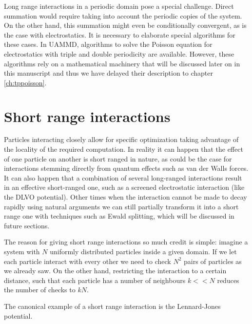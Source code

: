 \documentclass[twoside,openright,titlepage,numbers=noenddot,%
headinclude,footinclude,cleardoublepage=empty,abstract=on,
BCOR=5mm,fontsize=11pt, dvipsnames, paper=b5
]{scrreprt}
\newcommand{\uammd}{\gls{UAMMD}\xspace}
\begin{document}
Long range interactions in a periodic domain pose a special challenge. Direct summation would require taking into account the periodic copies of the system. On the other hand, this summation might even be conditionally convergent, as is the case with electrostatics. It is necessary to elaborate special algorithms for these cases. In \uammd, algorithms to solve the Poisson equation for electrostatics with triple and double periodicity are available. However, these algorithms rely on a mathematical machinery that will be discussed later on in this manuscript and thus we have delayed their description to chapter \ref{ch:tppoisson}.



\chapter{Short range interactions}\label{sec:shortrange}
Particles interacting closely allow for specific optimization taking advantage of the locality of the required computation.
In reality it can happen that the effect of one particle on another is short ranged in nature, as could be the case for interactions stemming directly from quantum effects such as van der Walls forces. It can also happen that a combination of several long-ranged interactions result in an effective short-ranged one, such as a screened electrostatic interaction (like the DLVO potential). Other times when the interaction cannot be made to decay rapidly using natural arguments we can still partially transform it into a short range one with techniques such as Ewald splitting, which will be discussed in future sections.

The reason for giving short range interactions so much credit is simple: imagine a system with $N$ uniformly distributed particles inside a given domain. If we let each particle interact with every other we need to check $N^2$ pairs of particles as we already saw. On the other hand, restricting the interaction to a certain distance, such that each particle has a number of neighbours $k<<N$ reduces the number of checks to $kN$.

The canonical example of a short range interaction is the Lennard-Jones potential.
\end{document}
